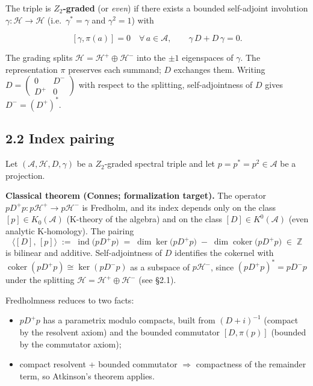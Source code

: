 \documentclass[
  11pt,
]{article}
\providecommand{\tightlist}{%
  \setlength{\itemsep}{0pt}\setlength{\parskip}{0pt}}
\begin{document}
The triple is \textbf{\(Z_2\)-graded} (or \emph{even}) if there exists a
bounded self-adjoint involution
\(\gamma\colon \mathcal{H}\to \mathcal{H}\) (i.e.~\(\gamma^* = \gamma\)
and \(\gamma^2 = 1\)) with

\[
[\gamma,\pi(a)] = 0 \quad \forall\,a \in \mathcal{A},
\qquad
\gamma\,D+ D\,\gamma = 0.
\]

The grading splits \(\mathcal{H}= \mathcal{H}^+ \oplus \mathcal{H}^-\)
into the \(\pm 1\) eigenspaces of \(\gamma\). The representation \(\pi\)
preserves each summand; \(D\) exchanges them. Writing
\(D= \begin{pmatrix} 0 & D^- \\ D^+ & 0 \end{pmatrix}\) with respect to
the splitting, self-adjointness of \(D\) gives \(D^- = (D^+)^*\).

\subsection{2.2 Index pairing}\label{index-pairing}

Let \((\mathcal{A}, \mathcal{H}, D, \gamma)\) be a \(Z_2\)-graded
spectral triple and let \(p = p^* = p^2 \in \mathcal{A}\) be a
projection.

\textbf{Classical theorem (Connes; formalization target).} The operator
\(p D^+ p \colon p\mathcal{H}^+ \to p\mathcal{H}^-\) is Fredholm, and
its index depends only on the class \([p] \in K_0(\mathcal{A})\)
(K-theory of the algebra) and on the class \([D] \in K^0(\mathcal{A})\)
(even analytic K-homology). The pairing \[
\bigl\langle [D],\,[p]\bigr\rangle
\;:=\; \mathop{\mathrm{ind}}\bigl(p D^+ p\bigr)
\;=\; \dim\ker\bigl(p D^+ p\bigr) \;-\; \dim\operatorname{coker}\bigl(p D^+ p\bigr)
\;\in\; \mathbb{Z}
\] is bilinear and additive. Self-adjointness of \(D\) identifies the
cokernel with \(\operatorname{coker}(p D^+ p) \cong \ker(p D^- p)\) as a
subspace of \(p\mathcal{H}^-\), since \((pD^+ p)^* = p D^- p\) under the
splitting \(\mathcal{H}= \mathcal{H}^+ \oplus \mathcal{H}^-\) (see
§2.1).

Fredholmness reduces to two facts:

\begin{itemize}
\tightlist
\item
  \(p D^+ p\) has a parametrix modulo compacts, built from
  \((D+ i)^{-1}\) (compact by the resolvent axiom) and the bounded
  commutator \([D, \pi(p)]\) (bounded by the commutator axiom);
\item
  compact resolvent + bounded commutator \(\Rightarrow\) compactness of
  the remainder term, so Atkinson's theorem applies.
\end{itemize}
\end{document}
